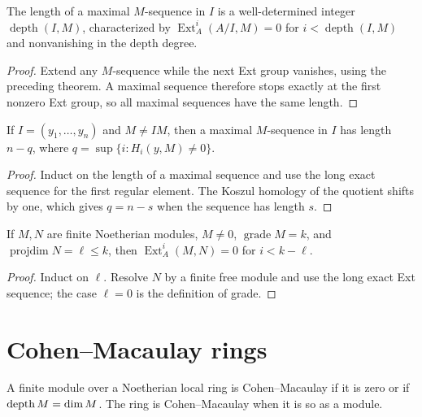 \begin{theorem}[Depth]\label{mcrt-thm-16-7}
The length of a maximal $M$-sequence in $I$ is a well-determined integer
$\operatorname{depth}(I,M)$, characterized by
$\operatorname{Ext}^i_A(A/I,M)=0$ for $i<\operatorname{depth}(I,M)$ and
nonvanishing in the depth degree.
\end{theorem}
\begin{proof}
Extend any $M$-sequence while the next Ext group vanishes, using the preceding
theorem.  A maximal sequence therefore stops exactly at the first nonzero Ext
group, so all maximal sequences have the same length.
\end{proof}

\begin{theorem}\label{mcrt-thm-16-8}
If $I=(y_1,\ldots,y_n)$ and $M\ne IM$, then a maximal $M$-sequence in $I$
has length $n-q$, where $q=\sup\{i:H_i(y,M)\ne0\}$.
\end{theorem}
\begin{proof}
Induct on the length of a maximal sequence and use the long exact sequence for
the first regular element.  The Koszul homology of the quotient shifts by one,
which gives $q=n-s$ when the sequence has length $s$.
\end{proof}

\begin{theorem}\label{mcrt-thm-16-9}
If $M,N$ are finite Noetherian modules, $M\ne0$, $\operatorname{grade}M=k$,
and $\operatorname{projdim}N=\ell\le k$, then
$\operatorname{Ext}^i_A(M,N)=0$ for $i<k-\ell$.
\end{theorem}
\begin{proof}
Induct on $\ell$.  Resolve $N$ by a finite free module and use the long exact
Ext sequence; the case $\ell=0$ is the definition of grade.
\end{proof}

\section{Cohen--Macaulay rings}
\begin{definition}\label{mcrt-def-cm}\uses{}
A finite module over a Noetherian local ring is Cohen--Macaulay if it is zero or
if $\operatorname{depth} M=\dim M$.  The ring is Cohen--Macaulay when it is so as a module.
\end{definition}

